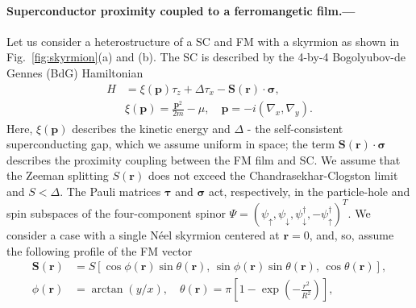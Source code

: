 \documentclass[twocolumn,showpacs,floatfix,longbibliography]{revtex4-1}
\begin{document}
\paragraph*{Superconductor proximity coupled to a ferromangetic film.--- }  \label{sec:model}
Let us consider a heterostructure of a SC and FM with a skyrmion as shown in Fig.~\ref{fig:skyrmion}(a) and (b). The SC is described by the 4-by-4 Bogolyubov-de Gennes (BdG) Hamiltonian
\begin{align}
 H &= \xi(\bm p)\tau_z+\Delta \tau_x - \bm S(\bm r)\cdot\bm\sigma, \label{ham} \\
   & \xi(\bm p) = \frac{\bm p^2}{2m}-\mu,\quad \bm p = -i(\nabla_x,\nabla_y).
\end{align}
Here, $\xi(\bm p)$ describes the kinetic energy and $\Delta$ - the self-consistent superconducting gap, which we assume uniform in space; the term $\bm S(\bm r)\cdot\bm\sigma$ describes the proximity coupling between the FM film and SC. We assume that the Zeeman splitting $S(\bm r)$ does not exceed the Chandrasekhar-Clogston limit and $S<\Delta$. The Pauli matrices $\bm \tau$ and $\bm \sigma$ act, respectively, in the particle-hole and spin subspaces of the four-component spinor $\Psi = (\psi_\uparrow,\psi_\downarrow,\psi^\dagger_\downarrow,-\psi^\dagger_\uparrow)^T$. We consider a case with a single N\'eel skyrmion \cite{Note1} centered at $\bm r = 0$, and, so, assume the following profile of the FM vector
\begin{align}
	\bm S(\bm r) &= S\left[ \cos\phi(\bm r) \sin\theta(\bm r),\, \sin\phi(\bm r)\sin\theta(\bm r),\,\cos\theta(\bm r)\right],\nonumber  \\
	\phi(\bm r) &= \arctan(y/x),\quad \theta(\bm r) = \pi \left[ 1-\exp\left( -\frac{r^2}{R^2} \right) \right], \label{conf}	
\end{align}
\end{document}
